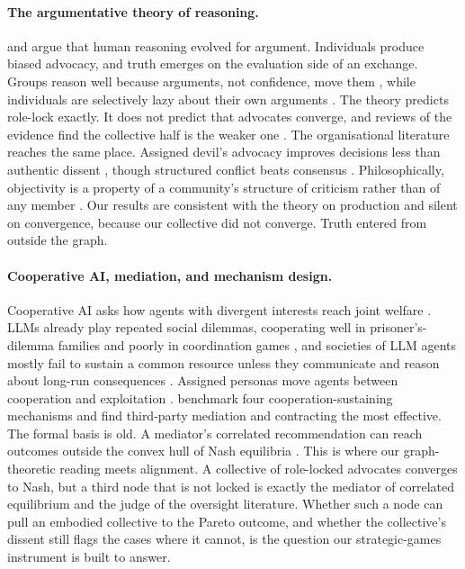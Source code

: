 \paragraph{The argumentative theory of reasoning.}
\citet{mercier2011argumentative} and \citet{mercier2017enigma} argue that
human reasoning evolved for argument. Individuals produce biased advocacy,
and truth emerges on the evaluation side of an exchange. Groups reason well
because arguments, not confidence, move them \citep{trouche2014arguments},
while individuals are selectively lazy about their own arguments
\citep{trouche2016selective}. The theory predicts role-lock exactly. It does
not predict that advocates converge, and reviews of the evidence find the
collective half is the weaker one \citep{mercier2016predictions}. The
organisational literature reaches the same place. Assigned devil's advocacy
improves decisions less than authentic dissent \citep{nemeth2001devil},
though structured conflict beats consensus \citep{schweiger1986group,schwenk1990effects}.
Philosophically, objectivity is a property of a community's structure of
criticism rather than of any member \citep{longino1990science,longino2002fate,popper2011open}.
Our results are consistent with the theory on production and silent on
convergence, because our collective did not converge. Truth entered from
outside the graph.

\paragraph{Cooperative AI, mediation, and mechanism design.}
Cooperative AI asks how agents with divergent interests reach joint welfare
\citep{dafoe2020cooperative}. LLMs already play repeated social dilemmas,
cooperating well in prisoner's-dilemma families and poorly in coordination
games \citep{akata2025repeated}, and societies of LLM agents mostly fail to
sustain a common resource unless they communicate and reason about
long-run consequences \citep{piatti2024cooperate}. Assigned personas move
agents between cooperation and exploitation \citep{leon2026personas}.
\citet{tewolde2026coopeval} benchmark four cooperation-sustaining mechanisms
and find third-party mediation and contracting the most effective. The
formal basis is old. A mediator's correlated recommendation can reach
outcomes outside the convex hull of Nash equilibria \citep{aumann1974subjectivity}.
This is where our graph-theoretic reading meets alignment. A collective of
role-locked advocates converges to Nash, but a third node that is not locked
is exactly the mediator of correlated equilibrium and the judge of the
oversight literature. Whether such a node can pull an embodied collective
to the Pareto outcome, and whether the collective's dissent still flags the
cases where it cannot, is the question our strategic-games instrument is
built to answer.
